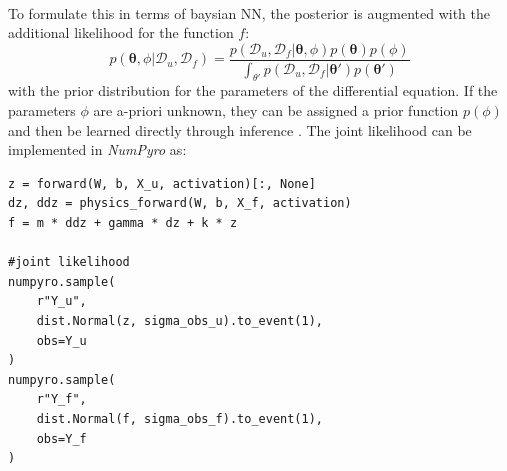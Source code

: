 \documentclass{article}
\begin{document}
\\
To formulate this in terms of baysian NN, the posterior is augmented with the additional likelihood for the function $f$:
\begin{equation} \label{eq:post_params_BPINN}
    p(\bm \theta, \phi|\mathcal{D}_u, \mathcal{D}_f) = \frac{p(\mathcal{D}_u, \mathcal{D}_f|\bm \theta, \phi)p(\bm \theta)p(\phi)}{\int_{\theta'}p(\mathcal{D}_u, \mathcal{D}_f|\bm \theta')p(\bm \theta')}
\end{equation}
with the prior distribution for the parameters of the differential equation. If the parameters $\phi$ are a-priori unknown, they can be assigned a prior function $p(\phi)$ and then be learned directly through inference \cite{raissi2017physicsIDL, Yang_2021}.
The joint likelihood can be implemented in \textit{NumPyro} as:
\begin{lstlisting}[caption={Joint likelihood for B-PINN},captionpos=t]
z = forward(W, b, X_u, activation)[:, None]
dz, ddz = physics_forward(W, b, X_f, activation)
f = m * ddz + gamma * dz + k * z

#joint likelihood
numpyro.sample(
    r"Y_u", 
    dist.Normal(z, sigma_obs_u).to_event(1), 
    obs=Y_u
)
numpyro.sample(
    r"Y_f", 
    dist.Normal(f, sigma_obs_f).to_event(1), 
    obs=Y_f
)
\end{lstlisting} 
\end{document}
